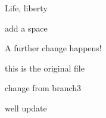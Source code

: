 \documentclass{article}
\begin{document}
Life, liberty
 
 add a space
 
 A further change happens!
 
 this is the original file%
 
 change from branch3 %
 
 well update
 
\end{document}
